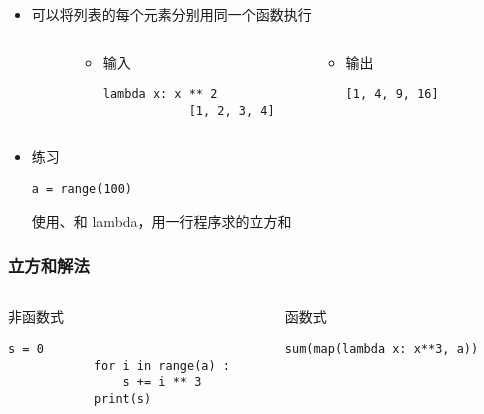 \begin{CJK}{UTF8}{gbsn}
\begin{frame} [fragile]
	\frametitle{}
	\begin{itemize}
	\item {}可以将列表的每个元素分别用同一个函数执行
	\begin{columns}
		\begin{column}[T]{.1\textwidth}
		\end{column}
		\begin{column}[T]{.4\textwidth}
			\begin{itemize}
			\item 输入
			\begin{lstlisting}[style=pythonstyle, gobble=12, texcl]
			lambda x: x ** 2
			[1, 2, 3, 4]
			\end{lstlisting}
			\end{itemize}
		\end{column}
		\begin{column}[T]{.4\textwidth}
			\begin{itemize}
			\item 输出
			\begin{lstlisting}[style=pythonstyle, gobble=12, texcl]
			[1, 4, 9, 16]
			\end{lstlisting}
			\end{itemize}
		\end{column}
		\begin{column}[T]{.1\textwidth}
		\end{column}
	\end{columns}
	\item 练习
		\begin{lstlisting}[style=pythonstyle, gobble=8, texcl]
		a = range(100)
		\end{lstlisting}
		使用、和\inlinePython
		{lambda}，用一行程序求\inlinePython{a}的立方和
	\end{itemize}
\end{frame}

\begin{frame} [fragile]
	\frametitle{立方和解法}
	\begin{columns}
		\begin{column}[T]{.42\textwidth}
			非函数式
			\begin{lstlisting}[style=pythonstyle, gobble=12, texcl]
			s = 0
			for i in range(a) :
				s += i ** 3
			print(s)
			\end{lstlisting}
		\end{column}
		\begin{column}[T]{.58\textwidth}
			函数式
			\begin{lstlisting}[style=pythonstyle, gobble=12, texcl]
			sum(map(lambda x: x**3, a))
			\end{lstlisting}


\end{column}
\end{columns}
\end{frame}
\end{CJK}
